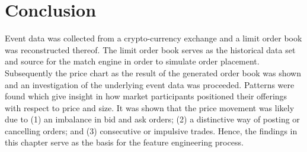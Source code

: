 \section{Conclusion}

Event data was collected from a crypto-currency exchange and a limit order book was reconstructed thereof.
The limit order book serves as the historical data set and source for the match engine in order to simulate order placement. 
Subsequently the price chart as the result of the generated order book was shown and an investigation of the underlying event data was proceeded.
Patterns were found which give insight in how market participants positioned their offerings with respect to price and size.
It was shown that the price movement was likely due to (1) an imbalance in bid and ask orders; (2) a distinctive way of posting or cancelling orders; and (3) consecutive or impulsive trades.
Hence, the findings in this chapter serve as the basis for the feature engineering process. 